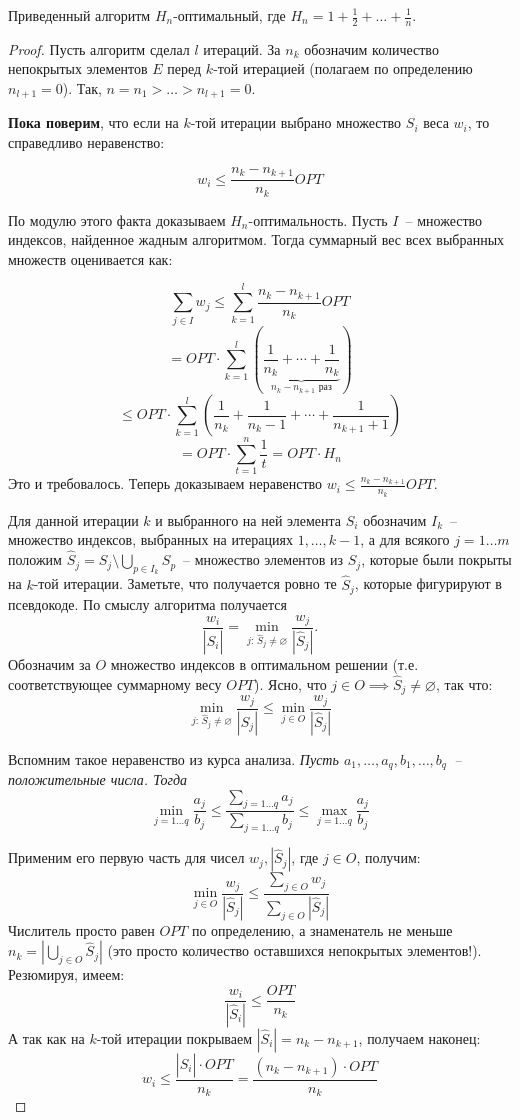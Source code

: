 \begin{theorem*} 
    Приведенный алгоритм $H_n$-оптимальный, где $H_n = 1 + \frac{1}{2} + \ldots + \frac{1}{n}$.
\end{theorem*}
\begin{proof}
    Пусть алгоритм сделал $l$ итераций. За $n_k$ обозначим количество непокрытых элементов $E$ перед $k$-той итерацией (полагаем по определению $n_{l+1}=0$). Так, $n = n_1 > \ldots > n_{l+1} = 0$.

    \textbf{Пока поверим}, что если на $k$-той итерации выбрано множество $S_i$ веса $w_i$, то справедливо неравенство:
    
    $$w_i \leq \frac{n_k - n_{k+1}}{n_k}OPT$$
    
    По модулю этого факта доказываем $H_n$-оптимальность. Пусть $I$~-- множество индексов, найденное жадным алгоритмом. Тогда суммарный вес всех выбранных множеств оценивается как:
    
    $$\sum_{j\in I}w_j \leq \sum_{k=1}^l\frac{n_k-n_{k+1}}{n_k} OPT$$
    $$ = OPT\cdot\sum_{k=1}^l\left(\underbrace{\frac{1}{n_k} + \cdots + \frac{1}{n_k}}_{n_k-n_{k+1}\text{ раз}}\right)$$
    $$ \leq OPT \cdot\sum_{k=1}^l\left(\frac{1}{n_k} + \frac{1}{n_k - 1} + \cdots + \frac{1}{n_{k+1}+1}\right)$$
    $$ = OPT\cdot\sum_{t=1}^n\frac{1}{t} = OPT\cdot H_n$$
    Это и требовалось. Теперь доказываем неравенство $w_i \leq \frac{n_k - n_{k+1}}{n_k}OPT$.
    
    Для данной итерации $k$ и выбранного на ней элемента $S_i$ обозначим $I_k$~-- множество индексов, выбранных на итерациях $1, \ldots, k-1$, а для всякого $j=1\ldots m$ положим $\hat{S}_j = S_j \setminus \bigcup_{p \in I_k}S_p$~-- множество элементов из $S_j$, которые были покрыты на $k$-той итерации. Заметьте, что получается ровно те $\hat{S}_j$, которые фигурируют в псевдокоде. По смыслу алгоритма получается $$\frac{w_i}{|\hat{S}_i|} = \min_{j:\, \hat{S}_j\neq\varnothing} \frac{w_j}{|\hat{S}_j|}.$$
    Обозначим за $O$ множество индексов в оптимальном решении (т.е. соответствующее суммарному весу $OPT$). Ясно, что $j \in O \implies \hat{S}_j \neq\varnothing$, так что: $$\min_{j:\, \hat{S}_j\neq\varnothing} \frac{w_j}{|\hat{S}_j|} \leq \min_{j \in O} \frac{w_j}{|\hat{S}_j|}$$
    
    Вспомним такое неравенство из курса анализа. \textit{Пусть $a_1, \ldots, a_q, b_1, \ldots, b_q$~-- положительные числа. Тогда}
    $$\min_{j=1\ldots q} \frac{a_j}{b_j} \leq \frac{\sum\limits_{j=1\ldots q} a_j}{\sum\limits_{j=1\ldots q} b_j} \leq \max_{j=1\ldots q} \frac{a_j}{b_j}$$
    
    Применим его первую часть для чисел $w_j, |\hat{S}_j|$, где $j \in O$, получим:
    $$\min_{j\in O} \frac{w_j}{\left|\hat{S}_j\right|} \leq \frac{\sum\limits_{j \in O} w_j}{\sum\limits_{j \in O} |\hat{S}_j|}$$
    Числитель просто равен $OPT$ по определению, а знаменатель не меньше $n_k = |\bigcup_{j \in O} \hat{S}_j|$ (это просто количество оставшихся непокрытых элементов!). Резюмируя, имеем: $$\frac{w_i}{|\hat{S}_i|} \leq \frac{OPT}{n_k}$$
    А так как на $k$-той итерации покрываем $|\hat{S}_i| = n_k - n_{k+1}$, получаем наконец:
    $$w_i \leq \frac{|\hat{S}_i|\cdot OPT}{n_k} = \frac{(n_k-n_{k+1})\cdot OPT}{n_k}$$

\end{proof}
